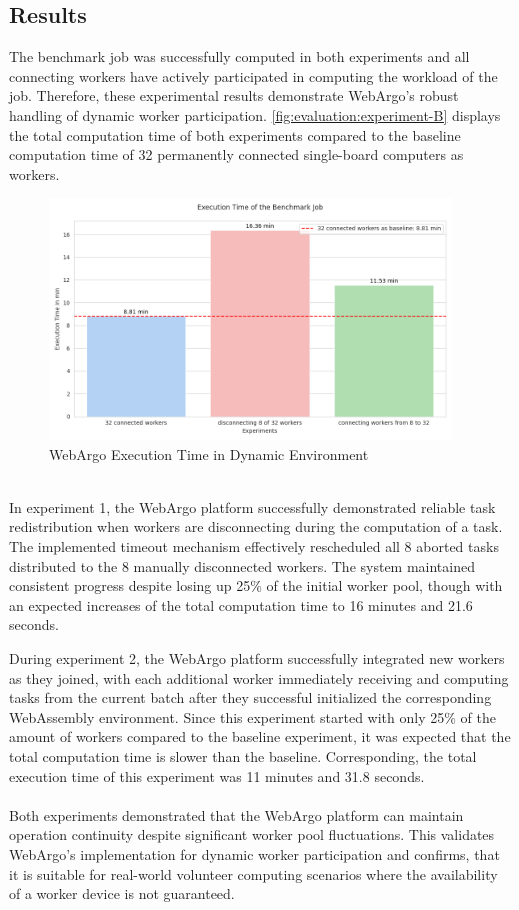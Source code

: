\subsection{Results}
The benchmark job was successfully computed in both experiments and all connecting workers have actively participated in computing the workload of the job. Therefore, these experimental results demonstrate WebArgo's robust handling of dynamic worker participation. \autoref{fig:evaluation:experiment-B} displays the total computation time of both experiments compared to the baseline computation time of 32 permanently connected single-board computers as workers.

\begin{figure}[htbp]
    \centering
    \includegraphics[width=0.95\textwidth]{gfx/figures/Evaluation_B.png}
    \caption{WebArgo Execution Time in Dynamic Environment}
    \label{fig:evaluation:experiment-B}
\end{figure}
~\\
In experiment 1, the WebArgo platform successfully demonstrated reliable task redistribution when workers are disconnecting during the computation of a task. The implemented timeout mechanism effectively rescheduled all 8 aborted tasks distributed to the 8 manually disconnected workers. The system maintained consistent progress despite losing up 25\% of the initial worker pool, though with an expected increases of the total computation time to 16 minutes and 21.6 seconds.

During experiment 2, the WebArgo platform successfully integrated new workers as they joined, with each additional worker immediately receiving and computing tasks from the current batch after they successful initialized the corresponding WebAssembly environment. Since this experiment started with only 25\% of the amount of workers compared to the baseline experiment, it was expected that the total computation time is slower than the baseline. Corresponding, the total execution time of this experiment was 11 minutes and 31.8 seconds. 
\\~\\
Both experiments demonstrated that the WebArgo platform can maintain operation continuity despite significant worker pool fluctuations. This validates WebArgo's implementation for dynamic worker participation and confirms, that it is suitable for real-world volunteer computing scenarios where the availability of a worker device is not guaranteed.

